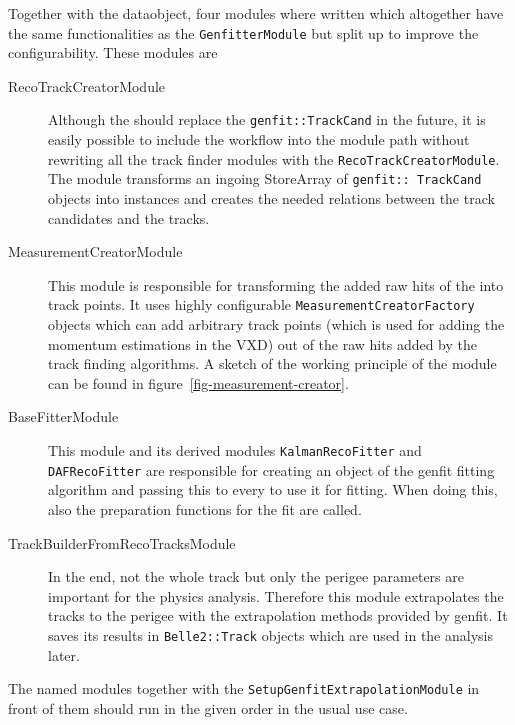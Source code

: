 Together with the \RecoTrack dataobject, four modules where written which altogether have the same functionalities as the \texttt{GenfitterModule} but split up to improve the configurability. These modules are
\begin{description}
 \item[RecoTrackCreatorModule] Although the \RecoTrack should replace the \texttt{genfit::Track\-Cand} in the future, it is easily possible to include the \RecoTrack workflow into the module path without rewriting all the track finder modules with the \texttt{Reco\-Track\-Creator\-Module}. The module transforms an ingoing StoreArray of \texttt{genfit::\ Track\-Cand} objects into \RecoTrack instances and creates the needed relations between the track candidates and the tracks.
 \item[MeasurementCreatorModule] This module is responsible for transforming the added raw hits of the \RecoTrack into track points. It uses highly configurable \texttt{MeasurementCreatorFactory} objects which can add arbitrary track points (which is used for adding the momentum estimations in the VXD) out of the raw hits added by the track finding algorithms. A sketch of the working principle of the module can be found in figure~\ref{fig-measurement-creator}.
 \item[BaseFitterModule] This module and its derived modules \texttt{KalmanRecoFitter} and \texttt{DAF\-Reco\-Fitter} are responsible for creating an object of the genfit fitting algorithm and passing this to every \RecoTrack to use it for fitting. When doing this, also the preparation functions for the fit are called.
 \item[TrackBuilderFromRecoTracksModule] In the end, not the whole track but only the perigee parameters are important for the physics analysis. Therefore this module extrapolates the tracks to the perigee with the extrapolation methods provided by genfit. It saves its results in \texttt{Belle2::Track} objects which are used in the analysis later.
\end{description}

The named modules together with the \texttt{SetupGenfitExtrapolationModule} in front of them should run in the given order in the usual use case.


